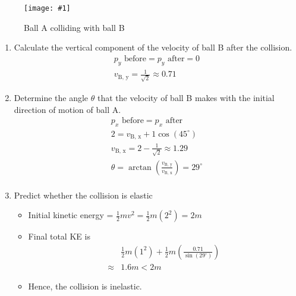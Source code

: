 \documentclass[a4paper,12pt]{article}
\newcommand{\degsym}{^{\circ}}
\newcommand{\img}[4]{\begin{center}
  \begin{figure}[H]
    \centering
    \texttt{[image: \#1]}
    \caption{#3}
    \label{fig:#4}
  \end{figure}
\end{center}}
\begin{document}
\img{ex/8.png}{0.5}{Ball A colliding with ball B}{ballcollision}

\begin{enumerate}[label=(\alph*)]
  \item Calculate the vertical component of the velocity of ball B after the collision.
        \begin{align*}
          p_y \text{ before} = p_y \text{ after} = 0 \\
          v_\text{B, y} = \frac{1}{\sqrt{2}} \approx 0.71
        \end{align*}
  \item Determine the angle $\theta$ that the velocity of ball B makes with the initial direction of motion of ball A.
        \begin{align*}
          p_x \text{ before} = p_x \text{ after}                                       \\
          2 = v_\text{B, x} + 1\cos(45\degsym)                                         \\
          v_\text{B, x} = 2 - \frac{1}{\sqrt{2}} \approx 1.29                          \\
          \theta = \arctan\left(\frac{v_\text{B, y}}{v_\text{B, x}}\right) = 29\degsym \\
        \end{align*}
  \item Predict whether the collision is elastic
        \begin{itemize}
          \item Initial kinetic energy = $\frac{1}{2}mv^2 = \frac{1}{2}m(2^2) = 2m$
          \item Final total KE is
                \begin{align*}
                          & \frac{1}{2}m(1^2) + \frac{1}{2}m\left(\frac{0.71}{\sin(29\degsym)}\right) \\
                  \approx & 1.6m < 2m
                \end{align*}
          \item Hence, the collision is inelastic.
        \end{itemize}
\end{enumerate}
\end{document}
